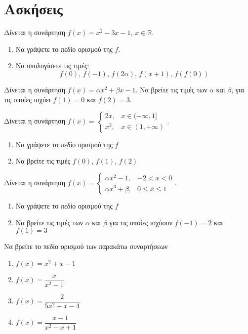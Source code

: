 \documentclass{../../presentation}
\begin{document}
\section{Ασκήσεις}

\begin{askisi}
  Δίνεται η συνάρτηση $f(x)=x^2-3x-1$, $x\in\mathbb{R}$.
  \begin{enumerate}[<+->]
    \item Να γράψετε το πεδίο ορισμού της $f$.
    \item Να υπολογίσετε τις τιμές:
          $$f(0) \text{, } f(-1) \text{, }f(2α) \text{, }f(x+1) \text{, }f\left(f(0)\right) $$
  \end{enumerate}
\end{askisi}

\begin{askisi}
  Δίνεται η συνάρτηση $f(x)=αx^2+βx-1$. Να βρείτε τις τιμές των $α$ και $β$, για τις οποίες ισχύει $f(1)=0$ και $f(2)=3$.
\end{askisi}

\begin{askisi}
  Δίνεται η συνάρτηση $f(x)=
    \begin{cases}
      2x,  & x\in(-\infty,1] \\
      x^2, & x\in(1,+\infty)
    \end{cases}$.
  \begin{enumerate}[<+->]
    \item Να γράψετε το πεδίο ορισμού της $f$
    \item Να βρείτε τις τιμές $f(0)$, $f(1)$, $f(2)$
  \end{enumerate}
\end{askisi}

\begin{askisi}
  Δίνεται η συνάρτηση $f(x)=
    \begin{cases}
      αx^2-1, & -2<x<0      \\
      αx^3+β, & 0\le x\le 1
    \end{cases}$.
  \begin{enumerate}[<+->]
    \item Να γράψετε το πεδίο ορισμού της $f$
    \item Να βρείτε τις τιμές των $α$ και $β$ για τις οποίες ισχύουν $f(-1)=2$ και $f(1)=3$
  \end{enumerate}
\end{askisi}

\begin{askisi}
  Να βρείτε το πεδίο ορισμού των παρακάτω συναρτήσεων
  \begin{enumerate}[<+->]
    \item $f(x)=x^2+x-1$
    \item $f(x)=\dfrac{x}{x^2-1}$
    \item $f(x)=\dfrac{2}{5x^2-x-4}$
    \item $f(x)=\dfrac{x-1}{x^2-x+1}$
  \end{enumerate}
\end{askisi}
\end{document}
